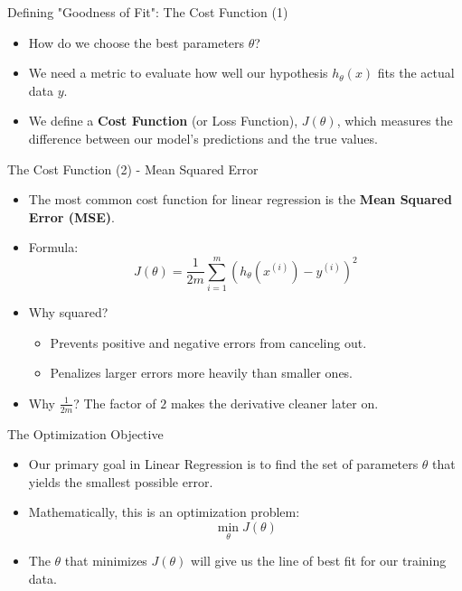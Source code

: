 \documentclass[aspectratio=169]{beamer}
\begin{document}
\begin{frame}{Defining "Goodness of Fit": The Cost Function (1)}
\begin{itemize}
    \item How do we choose the best parameters $\theta$?
    \item We need a metric to evaluate how well our hypothesis $h_\theta(x)$ fits the actual data $y$.
    \item We define a \textbf{Cost Function} (or Loss Function), $J(\theta)$, which measures the difference between our model's predictions and the true values.
\end{itemize}
\end{frame}

\begin{frame}{The Cost Function (2) - Mean Squared Error}
\begin{itemize}
    \item The most common cost function for linear regression is the \textbf{Mean Squared Error (MSE)}.
    \item Formula:
    $$ J(\theta) = \frac{1}{2m} \sum_{i=1}^{m} (h_\theta(x^{(i)}) - y^{(i)})^2 $$
    \item Why squared?
        \begin{itemize}
            \item Prevents positive and negative errors from canceling out.
            \item Penalizes larger errors more heavily than smaller ones.
        \end{itemize}
    \item Why $\frac{1}{2m}$? The factor of $2$ makes the derivative cleaner later on.
\end{itemize}
\end{frame}

\begin{frame}{The Optimization Objective}
\begin{itemize}
    \item Our primary goal in Linear Regression is to find the set of parameters $\theta$ that yields the smallest possible error.
    \item Mathematically, this is an optimization problem:
    $$ \min_\theta J(\theta) $$
    \item The $\theta$ that minimizes $J(\theta)$ will give us the line of best fit for our training data.
\end{itemize}
\end{frame}
\end{document}
